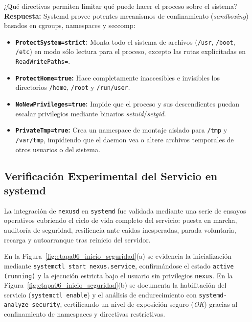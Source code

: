 \documentclass[10pt,a4paper]{article}
\begin{document}
\begin{pregunta}{¿Qué directivas permiten limitar qué puede hacer el proceso sobre el sistema?}
    \textbf{Respuesta:} Systemd provee potentes mecanismos de confinamiento (\textit{sandboxing}) basados en cgroups, namespaces y seccomp:
    \begin{itemize}[leftmargin=*]
        \item \textbf{\texttt{ProtectSystem=strict}:} Monta todo el sistema de archivos (\texttt{/usr}, \texttt{/boot}, \texttt{/etc}) en modo sólo lectura para el proceso, excepto las rutas explicitadas en \texttt{ReadWritePaths=}.
        \item \textbf{\texttt{ProtectHome=true}:} Hace completamente inaccesibles e invisibles los directorios \texttt{/home}, \texttt{/root} y \texttt{/run/user}.
        \item \textbf{\texttt{NoNewPrivileges=true}:} Impide que el proceso y sus descendientes puedan escalar privilegios mediante binarios \textit{setuid}/\textit{setgid}.
        \item \textbf{\texttt{PrivateTmp=true}:} Crea un namespace de montaje aislado para \texttt{/tmp} y \texttt{/var/tmp}, impidiendo que el daemon vea o altere archivos temporales de otros usuarios o del sistema.
    \end{itemize}
\end{pregunta}

\subsection{Verificación Experimental del Servicio en systemd}

La integración de \texttt{nexusd} en \texttt{systemd} fue validada mediante una serie de ensayos operativos cubriendo el ciclo de vida completo del servicio: puesta en marcha, auditoría de seguridad, resiliencia ante caídas inesperadas, parada voluntaria, recarga y autoarranque tras reinicio del servidor.

En la Figura~\ref{fig:etapa06_inicio_seguridad}(a) se evidencia la inicialización mediante \texttt{systemctl start nexus.service}, confirmándose el estado \texttt{active (running)} y la ejecución estricta bajo el usuario sin privilegios \texttt{nexus}. En la Figura~\ref{fig:etapa06_inicio_seguridad}(b) se documenta la habilitación del servicio (\texttt{systemctl enable}) y el análisis de endurecimiento con \texttt{systemd-analyze security}, certificando un nivel de exposición seguro (\textit{OK}) gracias al confinamiento de namespaces y directivas restrictivas.
\end{document}
